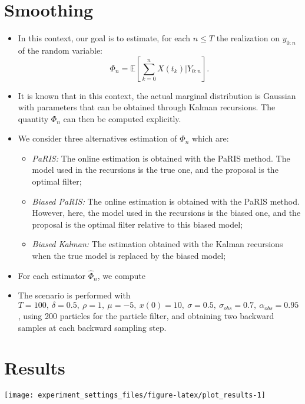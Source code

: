 \documentclass[]{article}
\providecommand{\tightlist}{%
  \setlength{\itemsep}{0pt}\setlength{\parskip}{0pt}}
\begin{document}
\section{Smoothing}\label{smoothing}

\begin{itemize}
\item
  In this context, our goal is to estimate, for each \(n\leq T\) the
  realization on \(y_{0:n}\) of the random variable:
  \[\Phi_n = \mathbb{E}\left[\sum_{k = 0}^{n} X(t_k)\vert Y_{0:n}\right].\]
\item
  It is known that in this context, the actual marginal distribution is
  Gaussian with parameters that can be obtained through Kalman
  recursions. The quantity \(\Phi_n\) can then be computed explicitly.
\item
  We consider three alternatives estimation of \(\Phi_n\) which are:

  \begin{itemize}
  \tightlist
  \item
    \emph{PaRIS:} The online estimation is obtained with the PaRIS
    method. The model used in the recursions is the true one, and the
    proposal is the optimal filter;
  \item
    \emph{Biased PaRIS:} The online estimation is obtained with the
    PaRIS method. However, here, the model used in the recursions is the
    biased one, and the proposal is the optimal filter relative to this
    biased model;
  \item
    \emph{Biased Kalman:} The estimation obtained with the Kalman
    recursions when the true model is replaced by the biased model;
  \end{itemize}
\item
  For each estimator \(\hat{\Phi}_n\), we compute
\item
  The scenario is performed with
  \(T = 100,~\delta = 0.5,~\rho = 1,~\mu = -5,~x(0) = 10,~\sigma = 0.5,~\sigma_{obs} = 0.7,~\alpha_{obs} = 0.95\),
  using 200 particles for the particle filter, and obtaining two
  backward samples at each backward sampling step.
\end{itemize}

\section{Results}\label{results}

\begin{center}\texttt{[image: experiment\_settings\_files/figure-latex/plot\_results-1]} \end{center}
\end{document}
